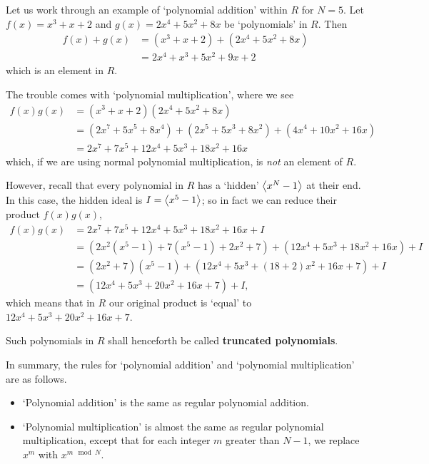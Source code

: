 \begin{example}
    Let us work through an example of `polynomial addition' within $R$ for $N = 5$. Let $f(x) = x^3 + x + 2$ and $g(x) = 2x^4 + 5x^2 + 8x$ be `polynomials' in $R$. Then
    \begin{align*}
        f(x) + g(x) &= (x^3 + x + 2) + (2x^4 + 5x^2 + 8x)\\
        &= 2x^4 + x^3 + 5x^2 + 9x + 2
    \end{align*}
    which is an element in $R$.

    The trouble comes with `polynomial multiplication', where we see
    \begin{align*}
        f(x)g(x) &= (x^3 + x + 2)(2x^4 + 5x^2 + 8x)\\
        &= (2x^7 + 5x^5 + 8x^4) + (2x^5 + 5x^3 + 8x^2) + (4x^4 + 10x^2 + 16x)\\
        &= 2x^7 + 7x^5 + 12x^4 + 5x^3 + 18x^2 + 16x
    \end{align*}
    which, if we are using normal polynomial multiplication, is \textit{not} an element of $R$.

    However, recall that every polynomial in $R$ has a `hidden' $\left\langle x^N - 1\right\rangle$ at their end. In this case, the hidden ideal is $I = \left\langle x^5-1\right\rangle$; so in fact we can reduce their product $f(x)g(x)$,
    \begin{align*}
        f(x)g(x) &= 2x^7 + 7x^5 + 12x^4 + 5x^3 + 18x^2 + 16x + I\\
        &= (2x^2(x^5-1) + 7(x^5-1) + 2x^2 + 7) + (12x^4 + 5x^3 + 18x^2 + 16x) + I\\
        &= (2x^2+7)(x^5-1) + (12x^4 + 5x^3 + (18 + 2)x^2 + 16x + 7) + I\\
        &= (12x^4 + 5x^3 + 20x^2 + 16x + 7) + I,
    \end{align*}
    which means that in $R$ our original product is `equal' to $12x^4 + 5x^3 + 20x^2 + 16x + 7$.
\end{example}

Such polynomials in $R$ shall henceforth be called \textbf{truncated polynomials}.

In summary, the rules for `polynomial addition' and `polynomial multiplication' are as follows.
\begin{itemize}
    \item `Polynomial addition' is the same as regular polynomial addition.
    \item `Polynomial multiplication' is almost the same as regular polynomial multiplication, except that for each integer $m$ greater than $N - 1$, we replace $x^m$ with $x^{m \mod N}$.
\end{itemize}

